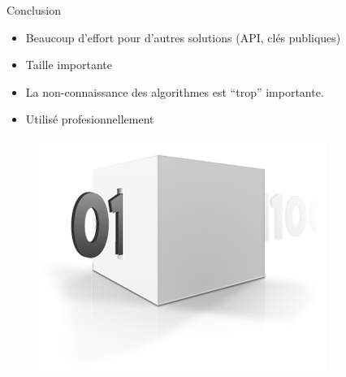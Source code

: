 \documentclass{beamer}
\begin{document}
\begin{frame}{Conclusion}
  
  \begin{itemize}
  \item Beaucoup d'effort pour d'autres solutions (API, clés publiques)
  \item Taille importante
  \item La non-connaissance des algorithmes est ``trop'' importante.
  \item Utilisé profesionnellement
  \end{itemize}

\begin{figure}[h]
  \centering
  \includegraphics[scale=0.6]{./images/conclusion.png}
\end{figure}

\end{frame}
\end{document}
